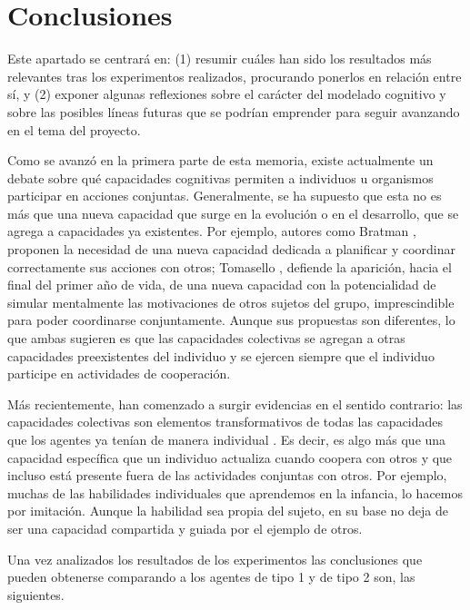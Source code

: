 \chapter{Conclusiones}
Este apartado se centrará en: (1) resumir cuáles han sido los resultados más relevantes tras los experimentos realizados,
procurando ponerlos en relación entre sí, y (2) exponer algunas reflexiones sobre el carácter del modelado cognitivo y sobre
las posibles líneas futuras que se podrían emprender para seguir avanzando en el tema del proyecto.

Como se avanzó en la primera parte de esta memoria, existe actualmente un debate sobre qué capacidades cognitivas permiten a
individuos u organismos participar en acciones conjuntas. Generalmente, se ha supuesto que esta no es más que una nueva capacidad
que surge en la evolución o en el desarrollo, que se agrega a capacidades ya existentes. Por ejemplo, autores como Bratman \cite{Bratman},
proponen la necesidad de una nueva capacidad dedicada a planificar y coordinar correctamente sus acciones con otros; Tomasello \cite{Tomasello},
defiende la aparición, hacia el final del primer año de vida, de una nueva capacidad con la potencialidad de simular mentalmente
las motivaciones de otros sujetos del grupo, imprescindible para poder coordinarse conjuntamente. Aunque sus propuestas son diferentes,
lo que ambas sugieren es que las capacidades colectivas se agregan a otras capacidades preexistentes del individuo y se ejercen siempre
que el individuo participe en actividades de cooperación.

Más recientemente, han comenzado a surgir evidencias en el sentido contrario: las capacidades colectivas son elementos transformativos de
todas las capacidades que los agentes ya tenían de manera individual \cite{KernMoll}. Es decir, es algo más que una capacidad específica que un
individuo actualiza cuando coopera con otros y que incluso está presente fuera de las actividades conjuntas con otros.
Por ejemplo, muchas de las habilidades individuales que aprendemos en la infancia, lo hacemos por imitación.
Aunque la habilidad sea propia del sujeto, en su base no deja de ser una capacidad compartida y guiada por el ejemplo de otros.

Una vez analizados los resultados de los experimentos las conclusiones que pueden obtenerse comparando a los agentes de tipo 1 y de tipo 2
son, las siguientes.

